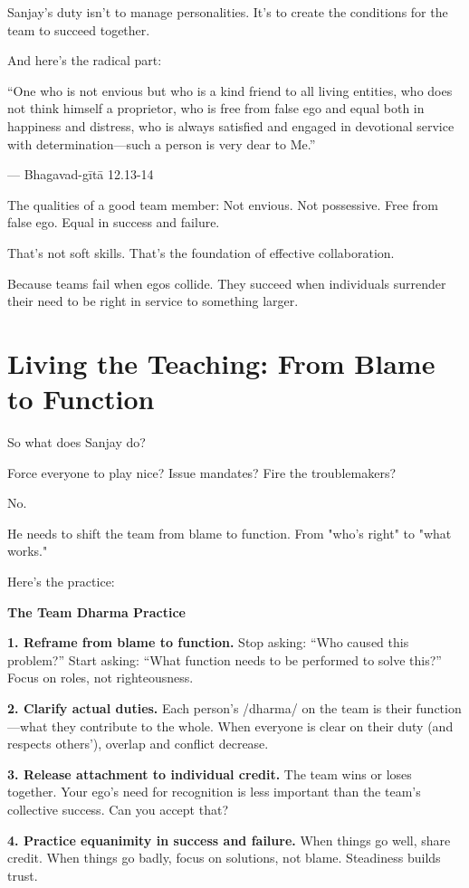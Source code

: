 \documentclass[11pt,twoside]{book}
\begin{document}
Sanjay's duty isn't to manage personalities. It's to create the conditions for the team to succeed together.

And here's the radical part:

\begin{pullquote}
``One who is not envious but who is a kind friend to all living entities, who does not think himself a proprietor, who is free from false ego and equal both in happiness and distress, who is always satisfied and engaged in devotional service with determination—such a person is very dear to Me.''

--- Bhagavad-gītā 12.13-14
\end{pullquote}

The qualities of a good team member: Not envious. Not possessive. Free from false ego. Equal in success and failure.

That's not soft skills. That's the foundation of effective collaboration.

Because teams fail when egos collide. They succeed when individuals surrender their need to be right in service to something larger.

\section*{Living the Teaching: From Blame to Function}

So what does Sanjay do?

Force everyone to play nice? Issue mandates? Fire the troublemakers?

No.

He needs to shift the team from blame to function. From "who's right" to "what works."

Here's the practice:

\begin{practicebox}
\textbf{The Team Dharma Practice}

\textbf{1. Reframe from blame to function.}
Stop asking: ``Who caused this problem?'' Start asking: ``What function needs to be performed to solve this?'' Focus on roles, not righteousness.

\textbf{2. Clarify actual duties.}
Each person's /dharma/ on the team is their function—what they contribute to the whole. When everyone is clear on their duty (and respects others'), overlap and conflict decrease.

\textbf{3. Release attachment to individual credit.}
The team wins or loses together. Your ego's need for recognition is less important than the team's collective success. Can you accept that?

\textbf{4. Practice equanimity in success and failure.}
When things go well, share credit. When things go badly, focus on solutions, not blame. Steadiness builds trust.
\end{practicebox}
\end{document}
